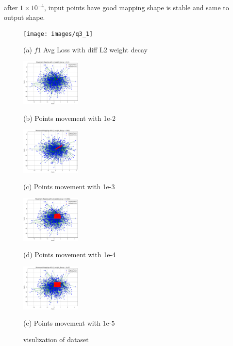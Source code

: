 \documentclass{article}
\begin{document}
after $1\times 10^{-4}$, input points have good mapping shape is stable and same to output shape.


\begin{figure}[htb]

  \begin{minipage}[b]{1.0\linewidth}
    \centering
    \centerline{\texttt{[image: images/q3\_1]}}
   \centerline{(a) $f1$ Avg Loss with diff L2 weight decay }\medskip
  \end{minipage}
  \begin{minipage}[b]{.48\linewidth}
    \centering
    \centerline{\includegraphics[width=3.0cm]{images/q3_1e-2}}
    \centerline{(b) Points movement with 1e-2}\medskip
  \end{minipage}
  \hfill
  \begin{minipage}[b]{0.48\linewidth}
    \centering
    \centerline{\includegraphics[width=3.0cm]{images/q3_1e-3}}
    \centerline{(c) Points movement with 1e-3}\medskip
  \end{minipage}
  \begin{minipage}[b]{.48\linewidth}
    \centering
    \centerline{\includegraphics[width=3.0cm]{images/q3_1e-4}}
    \centerline{(d) Points movement with 1e-4}\medskip
  \end{minipage}
  \hfill
  \begin{minipage}[b]{0.48\linewidth}
    \centering
    \centerline{\includegraphics[width=3.0cm]{images/q3_1e-5}}
    \centerline{(e) Points movement with 1e-5}\medskip
  \end{minipage}
  \caption{visulization of dataset}
  \label{fig:q3}
  \end{figure}
\end{document}

